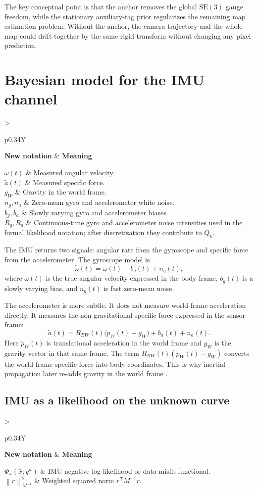 \documentclass[11pt]{report}
\newcommand{\SE}{\mathrm{SE}(3)}
\newcommand{\norm}[1]{\left\lVert #1 \right\rVert}
\newcommand{\tran}{^{\mathsf T}}
\newcommand{\NotationTable}[1]{%
\vspace{0.6mm}
{\scriptsize
\setlength{\tabcolsep}{2.5pt}
\begin{tabularx}{\columnwidth}{>{\raggedright\arraybackslash}p{0.34\columnwidth}Y}
\toprule
\textbf{New notation} & \textbf{Meaning}\\
\midrule
#1\\
\bottomrule
\end{tabularx}}
\vspace{0.8mm}}
\begin{document}
The key conceptual point is that the anchor removes the global $\SE$ gauge freedom, while the stationary auxiliary-tag prior regularizes the remaining map estimation problem. Without the anchor, the camera trajectory and the whole map could drift together by the same rigid transform without changing any pixel prediction.


\section{Bayesian model for the IMU channel}
\NotationTable{
$\widetilde\omega(t)$ & Measured angular velocity.\\
$\widetilde a(t)$ & Measured specific force.\\
$g_W$ & Gravity in the world frame.\\
$n_g,n_a$ & Zero-mean gyro and accelerometer white noise.\\
$b_g,b_a$ & Slowly varying gyro and accelerometer biases.\\
$R_g,R_a$ & Continuous-time gyro and accelerometer noise intensities used in the formal likelihood notation; after discretization they contribute to $Q_k$.}

The IMU returns two signals: angular rate from the gyroscope and specific force from the accelerometer. The gyroscope model is
\begin{equation}
\widetilde\omega(t)=\omega(t)+b_g(t)+n_g(t),
\label{eq:gyro_model_final}
\end{equation}
where $\omega(t)$ is the true angular velocity expressed in the body frame, $b_g(t)$ is a slowly varying bias, and $n_g(t)$ is fast zero-mean noise.

The accelerometer is more subtle. It does not measure world-frame acceleration directly. It measures the non-gravitational specific force expressed in the sensor frame:
\begin{equation}
\widetilde a(t)=R_{BW}(t)\big(\ddot p_W(t)-g_W\big)+b_a(t)+n_a(t).
\label{eq:accel_model_final}
\end{equation}
Here $\ddot p_W(t)$ is translational acceleration in the world frame and $g_W$ is the gravity vector in that same frame. The term $R_{BW}(t)(\ddot p_W(t)-g_W)$ converts the world-frame specific force into body coordinates. This is why inertial propagation later re-adds gravity in the world frame \citep{kok2017inertial,forster2017preintegration}.

\subsection{IMU as a likelihood on the unknown curve}
\NotationTable{
$\Phi_u(\bar x;y^u)$ & IMU negative log-likelihood or data-misfit functional.\\
$\norm{r}_{M^{-1}}^2$ & Weighted squared norm $r\tran M^{-1}r$.}
\end{document}
